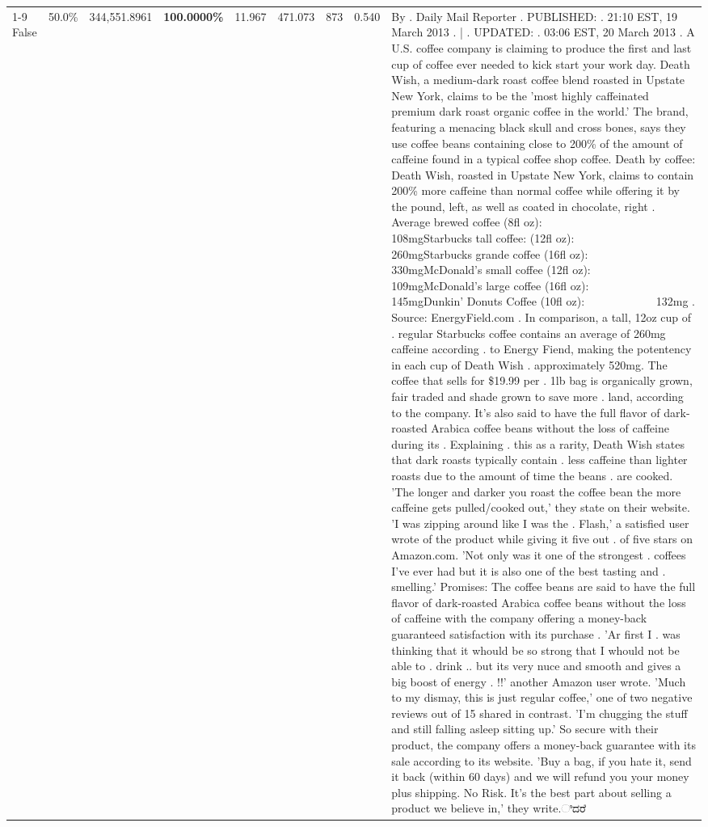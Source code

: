 \begin{table}[H]
{\begin{tabular}{lllrlllll}
\cline{1-9}
False & 50.0\% & 344,551.8961 & \bfseries \color{red} 100.0000\% & 11.967 & 471.073 & 873 & 0.540 & By . Daily Mail Reporter . PUBLISHED: . 21:10 EST, 19 March 2013 . | . UPDATED: . 03:06 EST, 20 March 2013 . A U.S. coffee company is claiming to produce the first and last cup of coffee ever needed to kick start your work day. Death Wish, a medium-dark roast coffee blend roasted in Upstate New York, claims to be the 'most highly caffeinated premium dark roast organic coffee in the world.' The brand, featuring a menacing black skull and cross bones, says they use coffee beans containing close to 200\% of the amount of caffeine found in a typical coffee shop coffee. Death by coffee: Death Wish, roasted in Upstate New York, claims to contain 200\% more caffeine than normal coffee while offering it by the pound, left, as well as coated in chocolate, right . Average brewed coffee (8fl oz):              108mgStarbucks tall coffee: (12fl oz):                260mgStarbucks grande coffee (16fl oz):         330mgMcDonald's small coffee (12fl oz):           109mgMcDonald's large coffee (16fl oz):           145mgDunkin' Donuts Coffee (10fl oz):             132mg . Source: EnergyField.com . In comparison, a tall, 12oz cup of . regular Starbucks coffee contains an average of 260mg caffeine according . to Energy Fiend, making the potentency in each cup of Death Wish . approximately 520mg. The coffee that sells for \$19.99 per . 1lb bag is organically grown, fair traded and shade grown to save more . land, according to the company. It's also said to have the full flavor of dark-roasted Arabica coffee beans without the loss of caffeine during its . Explaining . this as a rarity, Death Wish states that dark roasts typically contain . less caffeine than lighter roasts due to the amount of time the beans . are cooked. 'The longer and darker you roast the coffee bean the more caffeine gets pulled/cooked out,' they state on their website. 'I was zipping around like I was the . Flash,' a satisfied user wrote of the product while giving it five out . of five stars on Amazon.com. 'Not only was it one of the strongest . coffees I've ever had but it is also one of the best tasting and . smelling.’ Promises: The coffee beans are said to have the full flavor of dark-roasted Arabica coffee beans without the loss of caffeine with the company offering a money-back guaranteed satisfaction with its purchase . 'Ar first I . was thinking that it whould be so strong that I whould not be able to . drink .. but its very nuce and smooth and gives a big boost of energy . !!' another Amazon user wrote. 'Much to my dismay, this is just regular coffee,' one of two negative reviews out of 15 shared in contrast. 'I'm chugging the stuff and still falling asleep sitting up.' So secure with their product, the company offers a money-back guarantee with its sale according to its website. 'Buy a bag, if you hate it, send it back (within 60 days) and we will refund you your money plus shipping. No Risk. It’s the best part about selling a product we believe in,' they write.ಿದರೆ \\

\end{tabular}}
\end{table}
